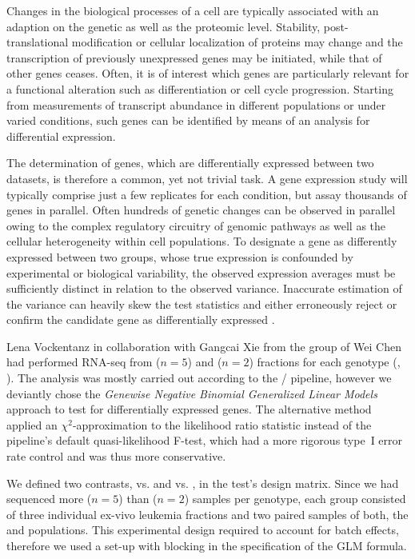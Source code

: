 Changes in the biological processes of a cell are typically associated with an adaption on the genetic as well as the proteomic level. Stability, post-translational modification or cellular localization of proteins may change and the transcription of previously unexpressed genes may be initiated, while that of other genes ceases. Often, it is of interest which genes are particularly relevant for a functional alteration such as differentiation or cell cycle progression. Starting from measurements of transcript abundance in different populations or under varied conditions, such genes can be identified by means of an analysis for differential expression. 

The determination of genes, which are differentially expressed between two datasets, is therefore a common, yet not trivial task. A gene expression study will typically comprise just a few replicates for each condition, but assay thousands of genes in parallel. Often hundreds of genetic changes can be observed in parallel owing to the complex regulatory circuitry of genomic pathways as well as the cellular heterogeneity within cell populations. To designate a gene as differently expressed between two groups, whose true expression is confounded by experimental or biological variability, the observed expression averages must be sufficiently distinct in relation to the observed variance.  Inaccurate estimation of the variance can heavily skew the test statistics and either erroneously reject or confirm the candidate gene as differentially expressed \supple.

Lena Vockentanz in collaboration with Gangcai Xie from the group of Wei Chen had performed RNA-seq from \mllafnine \kithi ($n\!= \!5$) and \kitlow ($n\!= \!2$) fractions for each genotype (\dnmtchip, \dnmtwt). The analysis was mostly carried out according to the / pipeline\cite{Chen2016c}, however we deviantly chose the \emph{Genewise Negative Binomial Generalized Linear Models} approach\cite{McCarthy2012} to test for differentially expressed genes. The alternative method applied an $\chi^2$-approximation to the likelihood ratio statistic instead of the pipeline's default quasi-likelihood F-test, which had a more rigorous type~I error rate control and was thus more conservative. 

We defined two contrasts, \dnmtchip vs. \dnmtwt and \kithi vs. \kitlow, in the test's design matrix. Since we had sequenced more \kithi ($n\!= \!5$) than \kitlow ($n\!= \!2$) samples per genotype, each group consisted of three individual ex-vivo leukemia \kithi fractions and two paired samples of both, the \kithi and \kitlow populations. This experimental design required to account for batch effects, therefore we used a set-up with blocking in the specification of the GLM formula. 


